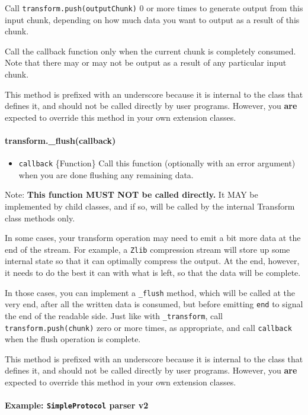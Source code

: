 Call \texttt{transform.push(outputChunk)} 0 or more times to generate
output from this input chunk, depending on how much data you want to
output as a result of this chunk.

Call the callback function only when the current chunk is completely
consumed. Note that there may or may not be output as a result of any
particular input chunk.

This method is prefixed with an underscore because it is internal to the
class that defines it, and should not be called directly by user
programs. However, you \textbf{are} expected to override this method in
your own extension classes.

\paragraph{transform.\_flush(callback)}

\begin{itemize}
\item
  \texttt{callback} \{Function\} Call this function (optionally with an
  error argument) when you are done flushing any remaining data.
\end{itemize}

Note: \textbf{This function MUST NOT be called directly.} It MAY be
implemented by child classes, and if so, will be called by the internal
Transform class methods only.

In some cases, your transform operation may need to emit a bit more data
at the end of the stream. For example, a \texttt{Zlib} compression
stream will store up some internal state so that it can optimally
compress the output. At the end, however, it needs to do the best it can
with what is left, so that the data will be complete.

In those cases, you can implement a \texttt{\_flush} method, which will
be called at the very end, after all the written data is consumed, but
before emitting \texttt{end} to signal the end of the readable side.
Just like with \texttt{\_transform}, call \texttt{transform.push(chunk)}
zero or more times, as appropriate, and call \texttt{callback} when the
flush operation is complete.

This method is prefixed with an underscore because it is internal to the
class that defines it, and should not be called directly by user
programs. However, you \textbf{are} expected to override this method in
your own extension classes.

\paragraph{Example: \texttt{SimpleProtocol} parser v2}

